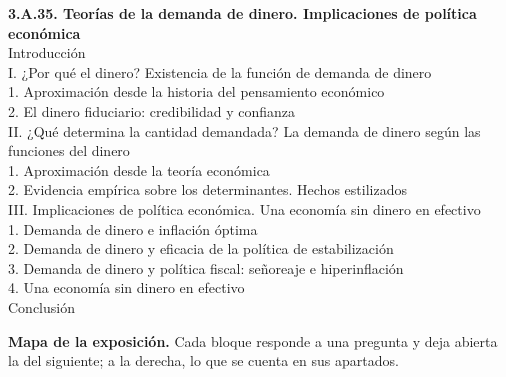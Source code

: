 \documentclass[11pt]{article}
\begin{document}
\begin{esquema}[unbreakable]
\textbf{3.A.35. Teorías de la demanda de dinero. Implicaciones de política económica}\\[2pt]
Introducción\\
I. ¿Por qué el dinero? Existencia de la función de demanda de dinero\\
\hspace*{1.5em}1. Aproximación desde la historia del pensamiento económico\\
\hspace*{1.5em}2. El dinero fiduciario: credibilidad y confianza\\
II. ¿Qué determina la cantidad demandada? La demanda de dinero según las funciones del dinero\\
\hspace*{1.5em}1. Aproximación desde la teoría económica\\
\hspace*{1.5em}2. Evidencia empírica sobre los determinantes. Hechos estilizados\\
III. Implicaciones de política económica. Una economía sin dinero en efectivo\\
\hspace*{1.5em}1. Demanda de dinero e inflación óptima\\
\hspace*{1.5em}2. Demanda de dinero y eficacia de la política de estabilización\\
\hspace*{1.5em}3. Demanda de dinero y política fiscal: señoreaje e hiperinflación\\
\hspace*{1.5em}4. Una economía sin dinero en efectivo\\
Conclusión
\end{esquema}

\begin{anotaciones}
\textbf{Mapa de la exposición.} Cada bloque responde a una pregunta y deja abierta la del siguiente; a la derecha, lo que se cuenta en sus apartados.
\begin{infografiacaja}
\caption{Mapa de la exposición: la pregunta de cada bloque y el hilo que los une}\label{figu:mapa-tema}
\end{infografiacaja}
\end{anotaciones}
\end{document}
